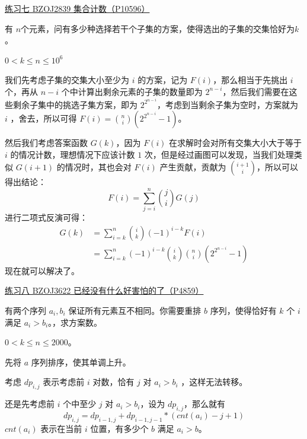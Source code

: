 \documentclass[UTF8]{beamer}
\begin{document}
    \begin{frame}
      \begin{block}{\href{https://www.luogu.com.cn/problem/P10596}{练习七 BZOJ2839
      集合计数（P10596）}}

      有 \(n\)个元素，问有多少种选择若干个子集的方案，使得选出的子集的交集恰好为\(k\)。

      \(0 < k \le n \le 10^6\)
      \end{block}
      \pause
      我们先考虑子集的交集大小至少为 \(i\) 的方案，记为
      \(F(i)\)，那么相当于先挑出 \(i\) 个，再从 \(n-i\)
      个中计算出剩余元素的子集的数量即为
      \(2^{n-i}\)，然后我们需要在这些剩余子集中的挑选子集方案，即为
      \(2^{2^{n-i}}\)，考虑到当剩余子集为空时，方案就为 \(i\) ，舍去，所以可得
      \(F(i)={n \choose i}(2^{2^{n-i}}-1)\)。
    \end{frame}
    \begin{frame}
      然后我们考虑答案函数 \(G(k)\)，因为 \(F(i)\)
      在求解时会对所有交集大小大于等于 \(i\) 的情况计数，理想情况下应该计数
      \(1\) 次，但是经过画图可以发现，当我们处理类似 \(G(i+1)\)
      的情况时，其也会对 \(F(i)\) 产生贡献，贡献为
      \({i+1 \choose i}\)，所以可以得出结论： 
      \[
      F(i)=\sum\limits_{j=i}^{n}{j \choose i}G(j)
      \] 
      进行二项式反演可得： 
      \[
      \begin{aligned}
      G(k)&=\sum\limits_{i=k}^{n}{i \choose k}(-1)^{i-k}F(i)\\
      &=\sum\limits_{i=k}^{n}(-1)^{i-k}{i \choose k}{n \choose i}(2^{2^{n-i}}-1)
      \end{aligned}
      \]
      现在就可以解决了。
    \end{frame}

    \begin{frame}
      \begin{block}{\href{https://www.luogu.com.cn/problem/P4859}{练习八 BZOJ3622
      已经没有什么好害怕的了（P4859）}}

      有两个序列 \(a_i,b_i\) 保证所有元素互不相同。你需要重排 \(b\)
      序列，使得恰好有 \(k\) 个 \(i\) 满足 \(a_i>b_i\)。，求方案数。

      \(0<k\leq n\leq2000\)。
      \end{block}
      \pause
      先将 \(a\) 序列排序，使其单调上升。

      考虑 \(dp_{i,j}\) 表示考虑前 \(i\) 对数，恰有 \(j\) 对 \(a_i>b_i\)
      ，这样无法转移。

      还是先考虑前 \(i\) 个中至少 \(j\) 对 \(a_i>b_i\)，设为
      \(dp_{i,j}\)，那么就有 \[
      dp_{i,j}=dp_{i-1,j}+dp_{i-1,j-1}*(cnt(a_i)-j+1)
      \] \(cnt(a_i)\) 表示在当前 \(i\) 位置，有多少个 \(b\) 满足 \(a_i>b\)。
    \end{frame}
\end{document}
